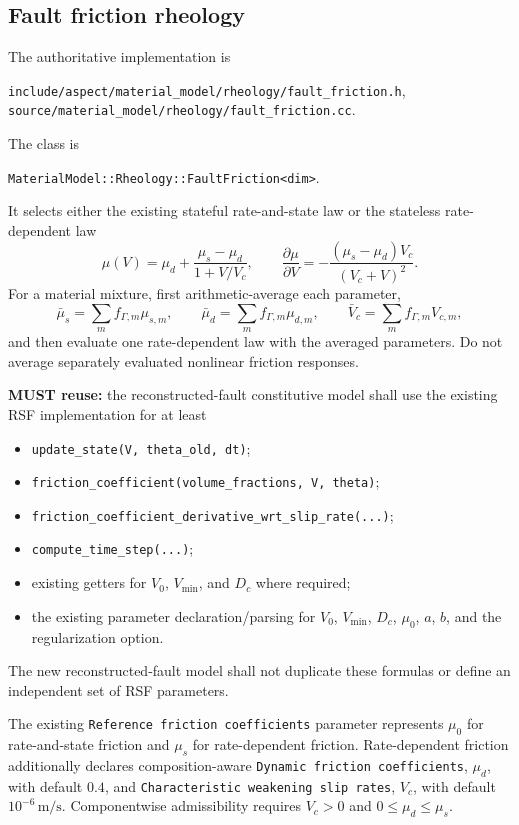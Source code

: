\documentclass[11pt]{article}
\begin{document}
\subsection{Fault friction rheology}
The authoritative implementation is
\begin{center}
\texttt{include/aspect/material\_model/rheology/fault\_friction.h},\qquad
\texttt{source/material\_model/rheology/fault\_friction.cc}.
\end{center}
The class is
\begin{center}
\texttt{MaterialModel::Rheology::FaultFriction<dim>}.
\end{center}
It selects either the existing stateful rate-and-state law or the stateless
rate-dependent law
\begin{equation}
  \mu(V)=\mu_d+\frac{\mu_s-\mu_d}{1+V/V_c},
  \qquad
  \frac{\partial\mu}{\partial V}
  =-\frac{(\mu_s-\mu_d)V_c}{(V_c+V)^2}.
\end{equation}
For a material mixture, first arithmetic-average each parameter,
\begin{equation}
  \bar\mu_s=\sum_m f_{\Gamma,m}\mu_{s,m},\qquad
  \bar\mu_d=\sum_m f_{\Gamma,m}\mu_{d,m},\qquad
  \bar V_c=\sum_m f_{\Gamma,m}V_{c,m},
\end{equation}
and then evaluate one rate-dependent law with the averaged parameters.  Do not
average separately evaluated nonlinear friction responses.

\textbf{MUST reuse:} the reconstructed-fault constitutive model shall use the existing RSF implementation for at least
\begin{itemize}
  \item \texttt{update\_state(V, theta\_old, dt)};
  \item \texttt{friction\_coefficient(volume\_fractions, V, theta)};
  \item \texttt{friction\_coefficient\_derivative\_wrt\_slip\_rate(...)};
  \item \texttt{compute\_time\_step(...)};
  \item existing getters for $V_0$, $V_{\min}$, and $D_c$ where required;
  \item the existing parameter declaration/parsing for $V_0$, $V_{\min}$, $D_c$, $\mu_0$, $a$, $b$, and the regularization option.
\end{itemize}
The new reconstructed-fault model shall not duplicate these formulas or define an independent set of RSF parameters.

The existing \texttt{Reference friction coefficients} parameter represents
$\mu_0$ for rate-and-state friction and $\mu_s$ for rate-dependent friction.
Rate-dependent friction additionally declares composition-aware
\texttt{Dynamic friction coefficients}, $\mu_d$, with default $0.4$, and
\texttt{Characteristic weakening slip rates}, $V_c$, with default
$10^{-6}\,\si{\meter\per\second}$.  Componentwise admissibility requires
$V_c>0$ and $0\leq\mu_d\leq\mu_s$.
\end{document}
